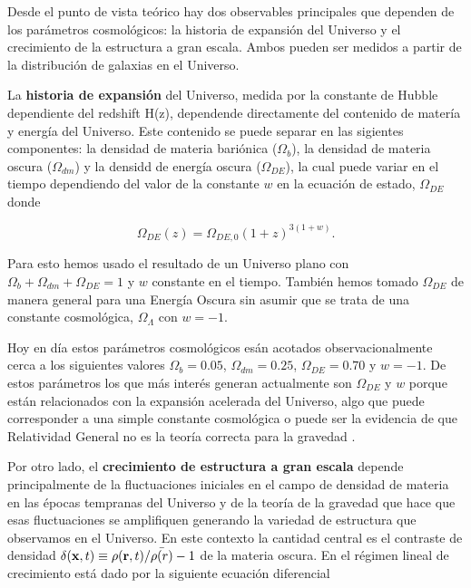 \documentclass[12pt]{article}
\begin{document}
Desde el punto de vista te\'orico hay dos observables principales que
dependen de los par\'ametros cosmol\'ogicos: la historia de
expansi\'on del Universo y el crecimiento de la estructura a gran
escala. Ambos pueden ser medidos a partir de la distribuci\'on de
galaxias en el Universo.

La {\bf historia de expansi\'on} del Universo, medida por la constante
de Hubble dependiente del redshift H(z), dependende directamente del
contenido de mater\'ia y energ\'ia del Universo. Este contenido se 
puede separar en las sigientes componentes: la densidad de materia
bari\'onica ($\Omega_b$), la densidad de materia oscura
($\Omega_{dm}$) y la densidd de energ\'ia  oscura  ($\Omega_{DE}$), la
cual puede variar en el tiempo dependiendo del valor de la constante
$w$ en la ecuaci\'on de estado, $\Omega_{DE}$ donde 

\begin{equation}
\Omega_{DE}(z) = \Omega_{DE,0}(1+z)^{3(1+w)}.
\end{equation}

Para esto hemos usado el resultado de un Universo plano con
$\Omega_b+\Omega_{dm}+\Omega_{DE}=1$ y $w$ constante en el tiempo.
Tambi\'en hemos tomado $\Omega_{DE}$ de manera general para una
Energ\'ia Oscura sin asumir que se trata de una constante
cosmol\'ogica, $\Omega_\Lambda$ con $w=-1$. 

Hoy en d\'ia estos par\'ametros cosmol\'ogicos es\'an
acotados observacionalmente cerca a los siguientes valores $\Omega_b=0.05$,
$\Omega_{dm}=0.25$, $\Omega_{DE}=0.70$ y $w=-1$. De estos
par\'ametros los que m\'as inter\'es generan actualmente son
$\Omega_{DE}$ y $w$ porque est\'an relacionados con  la expansi\'on
acelerada del Universo, algo que puede corresponder a una simple constante
cosmol\'ogica o puede ser la evidencia de que Relatividad General no
es la teor\'ia correcta para la gravedad 
\cite{2014arXiv1401.0046M}.

Por otro lado, el {\bf crecimiento de estructura a gran escala} depende
principalmente de la fluctuaciones iniciales en el campo de densidad
de materia en las \'epocas tempranas del Universo y de la teor\'ia de
la gravedad que hace que esas fluctuaciones se amplifiquen generando
la variedad de estructura que observamos en el Universo. En este
contexto la cantidad central es el contraste de densidad $\delta({\bf
  x},t)\equiv\rho({\bf r},t)/\bar{\rho(r)}-1$ de la materia oscura. En
el r\'egimen lineal de crecimiento est\'a dado por la siguiente
ecuaci\'on diferencial 
\end{document}
